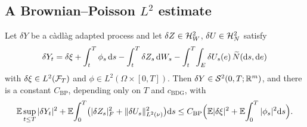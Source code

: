 \subsection{A Brownian--Poisson \texorpdfstring{$L^2$}{L2} estimate}

\begin{lemma}\label{lem:bpbsde}
Let $\delta Y$ be a c\`adl\`ag adapted process and let $\delta Z\in\mathcal{H}^2_W$, $\delta U\in\mathcal{H}^2_N$
satisfy
\begin{equation}\label{eq:dYlin}
\delta Y_t=\delta\xi+\int_t^T\phi_s\,\mathrm{d} s-\int_t^T\delta Z_s\,\mathrm{d} W_s-\int_t^T\!\int_E\delta U_s(e)\,\widetilde{N}(\mathrm{d} s,\mathrm{d} e)
\end{equation}
with $\delta\xi\in L^2(\mathcal{F}_T)$ and $\phi\in L^2(\Omega\times[0,T])$. Then
$\delta Y\in\mathcal{S}^2(0,T;\mathbb{R}^m)$, and there is a constant
$C_{\mathrm{BP}}$, depending only on $T$ and $c_{\mathrm{BDG}}$, with
\[
\mathbb{E}\sup_{t\le T}|\delta Y_t|^2+\mathbb{E}\!\int_0^T\!\big(|\delta Z_s|_F^2+\lVert \delta U_s\rVert_{L^2(\nu)}^2\big)\mathrm{d} s
\le C_{\mathrm{BP}}\Big(\mathbb{E}|\delta\xi|^2+\mathbb{E}\!\int_0^T|\phi_s|^2\mathrm{d} s\Big).
\]
\end{lemma}
